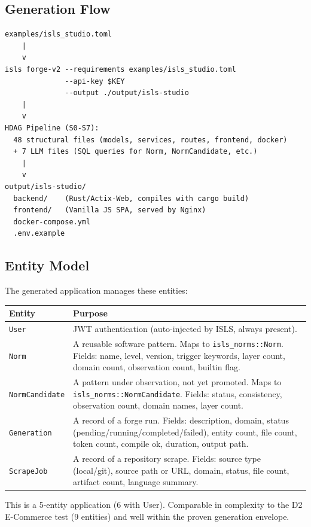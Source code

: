 \documentclass[11pt,a4paper]{article}
\begin{document}
\subsection{Generation Flow}

\begin{lstlisting}[style=bash]
examples/isls_studio.toml
    |
    v
isls forge-v2 --requirements examples/isls_studio.toml
              --api-key $KEY
              --output ./output/isls-studio
    |
    v
HDAG Pipeline (S0-S7):
  48 structural files (models, services, routes, frontend, docker)
  + 7 LLM files (SQL queries for Norm, NormCandidate, etc.)
    |
    v
output/isls-studio/
  backend/    (Rust/Actix-Web, compiles with cargo build)
  frontend/   (Vanilla JS SPA, served by Nginx)
  docker-compose.yml
  .env.example
\end{lstlisting}

\subsection{Entity Model}

The generated application manages these entities:

\begin{longtable}{lp{9cm}}
\toprule
\textbf{Entity} & \textbf{Purpose} \\
\midrule
\texttt{User}
  & JWT authentication (auto-injected by ISLS, always present). \\
\texttt{Norm}
  & A reusable software pattern. Maps to \texttt{isls\_norms::Norm}.
    Fields: name, level, version, trigger keywords, layer count,
    domain count, observation count, builtin flag. \\
\texttt{NormCandidate}
  & A pattern under observation, not yet promoted. Maps to
    \texttt{isls\_norms::NormCandidate}. Fields: status, consistency,
    observation count, domain names, layer count. \\
\texttt{Generation}
  & A record of a forge run. Fields: description, domain, status
    (pending/running/completed/failed), entity count, file count,
    token count, compile ok, duration, output path. \\
\texttt{ScrapeJob}
  & A record of a repository scrape. Fields: source type
    (local/git), source path or URL, domain, status, file count,
    artifact count, language summary. \\
\bottomrule
\end{longtable}

This is a 5-entity application (6 with User). Comparable in complexity
to the D2 E-Commerce test (9 entities) and well within the proven
generation envelope.
\end{document}
